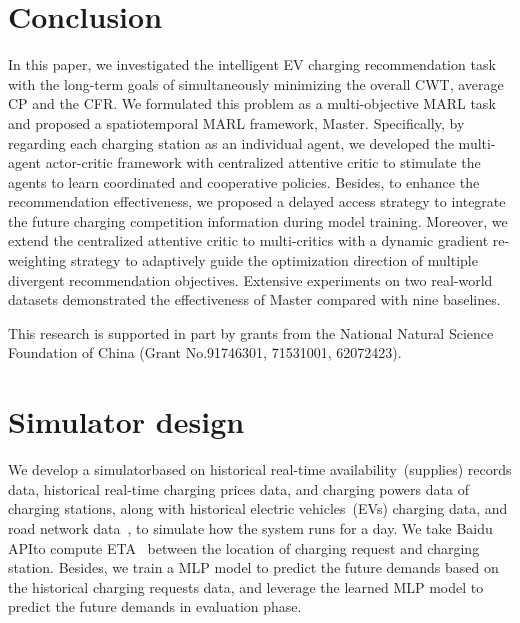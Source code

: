 \documentclass[sigconf]{acmart}
\newcommand{\liu}[1]{{\color{black}{#1}}}
\newcommand{\stddpg}{{\sc Master}\xspace}
\begin{document}
% 
\section{Conclusion}\label{sec:conclusion}
In this paper, we investigated the intelligent EV charging recommendation task with the long-term goals of simultaneously minimizing the overall CWT, average CP and the CFR. We formulated this problem as a multi-objective MARL task and proposed a spatiotemporal MARL framework, \stddpg. Specifically, by regarding each charging station as an individual agent, we developed the multi-agent actor-critic framework with centralized attentive critic to stimulate the agents to learn coordinated and cooperative policies. Besides, to enhance the recommendation effectiveness, we proposed a delayed access strategy to integrate the future charging competition information during model training. Moreover, we extend the centralized attentive critic to multi-critics with a dynamic gradient re-weighting strategy to adaptively guide the optimization direction of multiple divergent recommendation objectives. Extensive experiments on two real-world datasets demonstrated the effectiveness of \stddpg compared with nine baselines. 

\begin{acks}
This research is supported in part by grants from the National Natural Science Foundation of China (Grant No.91746301, 71531001, 62072423).
\end{acks}




\appendix
\section{Simulator design}
\label{app:simulator}
We develop a simulator\footnotemark[1] based on historical real-time availability~(supplies) records data, historical real-time charging prices data, and charging powers data of charging stations, along with historical electric vehicles~(EVs) charging data, and road network data~\liu{\cite{liu2020multi}}, to simulate how the system runs for a day. We take Baidu API\footnotemark[2] to compute ETA~\liu{\cite{liu2020incorporating}} between the location of charging request and charging station. 
Besides, we train a MLP model to predict the future demands based on the historical charging requests data, and leverage the learned MLP model to predict the future demands in evaluation phase.
\end{document}

